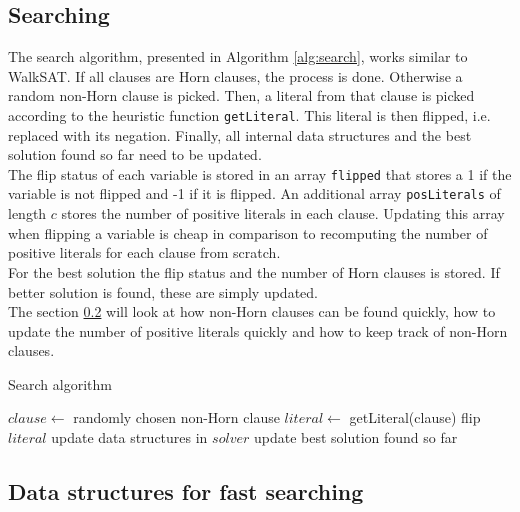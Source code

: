 \documentclass[12pt,a4paper]{article}
\begin{document}
\subsection{Searching}
The search algorithm, presented in Algorithm \ref{alg:search}, works similar to WalkSAT. If all clauses are Horn clauses, the process is done. Otherwise a random non-Horn clause is picked. Then, a literal from that clause is picked according to the heuristic function \texttt{getLiteral}. This literal is then flipped, i.e. replaced with its negation. Finally, all internal data structures and the best solution found so far need to be updated.\\
The flip status of each variable is stored in an array \texttt{flipped} that stores a 1 if the variable is not flipped and -1 if it is flipped. An additional array \texttt{posLiterals} of length $c$ stores the number of positive literals in each clause. Updating this array when flipping a variable is cheap in comparison to recomputing the number of positive literals for each clause from scratch. \\
For the best solution the flip status and the number of Horn clauses is stored. If better solution is found, these are simply updated.\\
The section \ref{sec:dat_struc_fast_search} will look at how non-Horn clauses can be found quickly, how to update the number of positive literals quickly and how to keep track of non-Horn clauses.
\begin{algorithm}[ht]
  \caption{Search algorithm}
  \label{alg:search}
  \begin{algorithmic}[1] 
    \State \Return{}
    \EndIf
    \State $clause \leftarrow$ randomly chosen non-Horn clause
    \State $literal \leftarrow$ getLiteral(clause)
    \State flip $literal$
    \State update data structures in $solver$
    \State update best solution found so far
    \EndFor
    \EndProcedure
  \end{algorithmic}
\end{algorithm}
\subsection{Data structures for fast searching}
\label{sec:dat_struc_fast_search}
\end{document}
